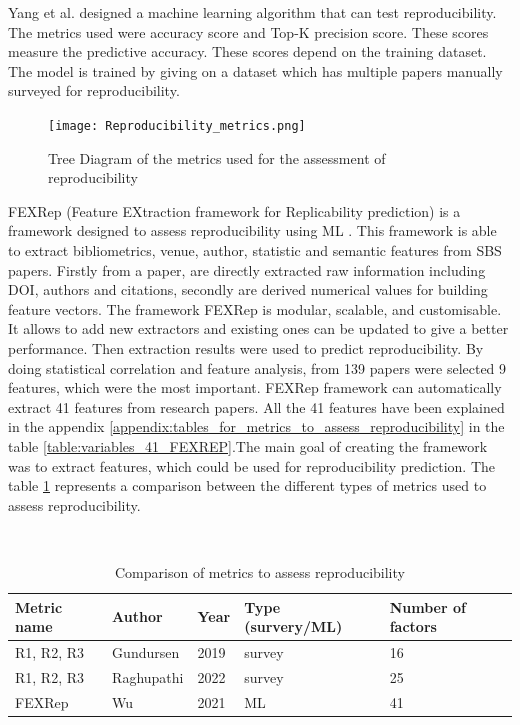 \documentclass[
10pt, %
a4paper, %
oneside, %
headinclude,footinclude, %
BCOR5mm, %
]{scrartcl}
\begin{document}
Yang et al. designed a machine learning algorithm that can test reproducibility. The metrics used were accuracy score and Top-K precision score. These scores measure the predictive accuracy. These scores depend on the training dataset. The model is trained by giving on a dataset which has multiple papers manually surveyed for reproducibility. 

\begin{figure}[!hbt] 
\centering
  \texttt{[image: Reproducibility\_metrics.png]}
  \caption{Tree Diagram of the metrics used for the assessment of reproducibility}
  \label{fig:tree_diagram_metrics}
  \end{figure}

FEXRep (Feature EXtraction framework for Replicability prediction) is a framework designed to assess reproducibility using ML \cite{Wu2021PredictingTR}. 
This framework is able to extract bibliometrics, venue, author, statistic and semantic features from SBS papers. Firstly from a paper, 
are directly extracted raw information including DOI, authors and citations, secondly are derived numerical values for building feature vectors. 
The framework FEXRep is modular, scalable, and customisable. It allows to add new extractors and existing ones can be updated to give a better performance.
Then extraction results were used to predict reproducibility. By doing statistical correlation and feature analysis, from 139 papers were selected 9 features,
which were the most important. 
FEXRep framework can automatically extract 41 features from research papers. All the 41 features have been explained in the appendix \ref{appendix:tables_for_metrics_to_assess_reproducibility} in the table \ref{table:variables_41_FEXREP}.The main goal of creating the framework was to extract features, which could be used for reproducibility prediction. The table \ref{table:metrics_comparision} represents a comparison between the different types of metrics used to assess reproducibility.

\begin{table}[!htb]
\caption{Comparison of metrics to assess reproducibility}\
\label{table:metrics_comparision}
\begin{tabular}[t]{|p{2cm}|p{2cm}|p{1cm}|p{3cm}|p{2cm}|}
\hline
Metric name & Author      & Year                     & Type (survery/ML) & Number of factors      \\ \hline
R1, R2, R3  & Gundursen   & 2019 & survey             & 16 \\ \hline
R1, R2, R3  & Raghupathi & 2022 & survey             & 25 \\ \hline
FEXRep & Wu & 2021 & ML             & 41 \\ \hline
\end{tabular}
\end{table}
\end{document}
